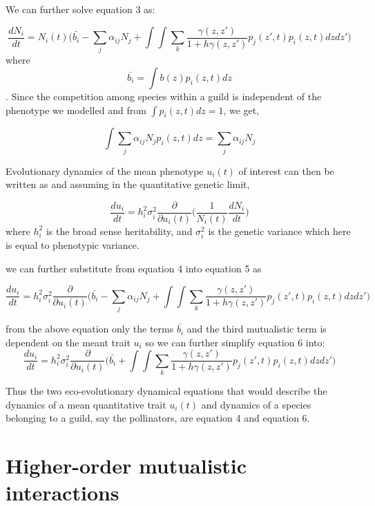 \documentclass{elsarticle}
\begin{document}
We can further solve equation 3 as:

\begin{equation}
    \frac{dN_{i}}{dt} = N_{i}(t) \Bigg( \bar{b_{i}} -  \sum_{j}\alpha_{ij}N_{j} + \int\int\sum_{k} \frac{\gamma(z,z')}{1+ h\gamma(z,z')} p_{j}(z',t)p_{i}(z,t)dzdz' \Bigg) 
\end{equation}
where $$\bar{b_{i}} =\int b(z) p_{i}(z,t)dz $$.
Since the competition among species within a guild is independent of the phenotype we modelled and from $ \int p_i(z,t) dz = 1$, we get,

$$ \int \sum_{j}\alpha_{ij}N_{j}p_{i}(z,t)dz = \sum_{j}\alpha_{ij}N_{j} $$

Evolutionary dynamics of the mean phenotype $u_i(t)$ of interest can then be written as and assuming in the quantitative genetic limit,

\begin{equation}
    \frac{du_{i}}{dt} = h_i^2 \sigma_i^2\frac{\partial}{\partial u_{i}(t)}\bigg( \frac{1}{N_{i}(t)}\frac{dN_{i}}{dt}\bigg)
\end{equation}
where $ h_i^2 $ is the broad sense heritability, and $\sigma_i^2$ is the genetic variance which here is equal to phenotypic variance.

we can further substitute from equation 4 into equation 5 as


\begin{equation}
    \frac{du_{i}}{dt} = h_i^2\sigma_i^2\frac{\partial}{\partial u_{i}(t)}\bigg( \bar{b_{i}} -  \sum_{j}\alpha_{ij}N_{j} + \int\int\sum_{k} \frac{\gamma(z,z')}{1+ h\gamma(z,z')} p_{j}(z',t)p_{i}(z,t)dzdz'\bigg)
\end{equation}

from the above equation only the terms $\bar{b_{i}}$ and the third mutualistic term is dependent on the meant trait $u_{i}$ so we can further simplify equation 6 into:
\begin{equation}
    \frac{du_{i}}{dt} =  h_i^2\sigma_i^2\frac{\partial}{\partial u_{i}(t)}\bigg( \bar{b_{i}} + \int\int\sum_{k} \frac{\gamma(z,z')}{1+ h\gamma(z,z')} p_{j}(z',t)p_{i}(z,t)dzdz'\bigg)
\end{equation}

Thus the two eco-evolutionary dynamical equations that would describe the dynamics of a mean quantitative trait $u_{i}(t)$ and dynamics of a species belonging to a guild, say the pollinators, are equation 4 and equation 6.



\section{Higher-order mutualistic interactions}
\end{document}
